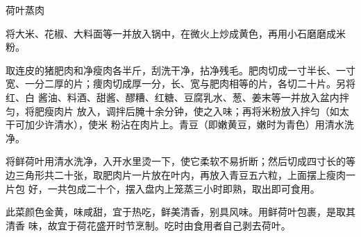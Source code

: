 %
%
%
%
%
%
%
\begin{recipe}{荷叶蒸肉}

\ingredients


\preparation

\step 将大米、花椒、大料面等一并放入锅中，在微火上炒成黄色，再用小石磨磨成米
粉。

\step 取连皮的猪肥肉和净瘦肉各半斤，刮洗干净，拈净残毛。肥肉切成一寸半长、一寸
宽、一分二厚的片；痩肉切成厚一分，长、宽与肥肉相等的片，各切二十片。另将红、白
酱油、料酒、甜酱、醪糟、红糖、豆腐乳水、葱、姜末等一并放入盆内拌匀，将肥瘦肉片
放入，调拌后腌十余分钟，使之入味；再将米粉放入拌匀（如太干可加少许清水），使米
粉沾在肉片上。青豆（即嫩黄豆，嫩时为青色）用清水洗净。

\step 将鲜荷叶用清水洗净，入开水里烫一下，使它柔软不易折断；然后切成四寸长的等
边三角形共二十张，取肥肉片一片放在叶内，再放入青豆五六粒，上面摆上瘦肉一片包
好，一共包成二十个，摆入盘内上笼蒸三小时即熟，取出即可食用。

\features

此菜颜色金黄，味咸甜，宜于热吃，鲜美清香，别具风味。用鲜荷叶包裹，是取其清香
味，故宜于荷花盛开时节烹制。吃时由食用者自己剥去荷叶。

\end{recipe}

